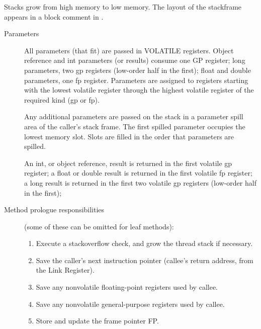 
Stacks grow from high memory to low memory.
The layout of the stackframe appears in a block comment in
{\PPCStackframeLayoutURL}.


\begin{description}
\item[Parameters]

    All parameters (that fit) are passed in VOLATILE registers.  Object
    reference and int parameters (or results) consume one GP register; long
    parameters, two gp registers (low-order half in the first);  float and
    double parameters, one fp register.  Parameters are 
    assigned to registers
    starting with the lowest volatile register through the highest volatile
    register of the required kind (gp or fp).

    Any additional parameters are passed on the stack in a parameter spill
    area of the caller's stack frame.  The first spilled parameter occupies
    the lowest memory slot.  Slots are filled in the order that parameters
    are spilled.

    An int, or object reference, result is returned in the first volatile
    gp register; a float or double result is returned in the first volatile
    fp register; a long result is returned in the first two volatile gp
    registers (low-order half in the first);

\item[Method prologue responsibilities] (some of these can be omitted for leaf
  methods):

\begin{enumerate}
\item Execute a stackoverflow check, and grow the thread stack if necessary.

\item Save the caller's next instruction pointer (callee's return address,
       from the Link Register).

\item Save any nonvolatile floating-point registers used by callee.

\item Save any nonvolatile general-purpose registers used by callee.

\item Store and update the frame pointer FP.


\end{enumerate}
\end{description}
